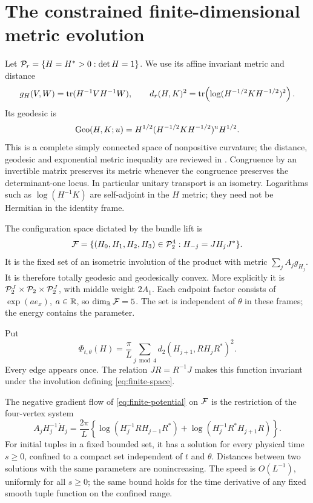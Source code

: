 \section{The constrained finite-dimensional metric evolution}\label{sec:finite-flow}

Let $\mathcal P_r=\{H=H^*>0:\det H=1\}$. We use its affine invariant metric
and distance
\begin{equation}\label{eq:matrix-metric}
 g_H(V,W)=\operatorname{tr}(H^{-1}VH^{-1}W),\qquad
 d_r(H,K)^2=\operatorname{tr}\!\left(\log(H^{-1/2}KH^{-1/2})^2\right).
\end{equation}
Its geodesic is
\[
 \operatorname{Geo}(H,K;u)=H^{1/2}(H^{-1/2}KH^{-1/2})^uH^{1/2}.
\]
This is a complete simply connected space of nonpositive curvature;
the distance, geodesic and exponential metric inequality are reviewed
in \cite[Section 2.3]{bhatia}.
Congruence by an invertible matrix preserves its metric whenever the
congruence preserves the determinant-one locus. In particular unitary
transport is an isometry. Logarithms such as $\log(H^{-1}K)$ are
self-adjoint in the $H$ metric; they need not be Hermitian in the
identity frame.

The configuration space dictated by the bundle lift is
\begin{equation}\label{eq:finite-space}
 \mathcal F=\{(H_0,H_1,H_2,H_3)\in\mathcal P_2^4:
                   H_{-j}=JH_jJ^*\}.
\end{equation}
It is the fixed set of an isometric involution of the product with metric
$\sum_jA_jg_{H_j}$. It is therefore totally geodesic and geodesically
convex. More explicitly it is
$\mathcal P_2^J\times\mathcal P_2\times\mathcal P_2^J$, with middle weight $2A_1$.
Each endpoint factor consists of $\exp(ae_x)$, $a\in\mathbb R$, so
$\dim_\mathbb R\mathcal F=5$. The set is independent of $\theta$ in these frames;
the energy contains the parameter.

Put
\begin{equation}\label{eq:finite-potential}
 \Phi_{t,\theta}(H)=\frac\pi L\sum_{j\bmod4}
                d_2(H_{j+1},RH_jR^*)^2.
\end{equation}
Every edge appears once. The relation $JR=R^{-1}J$ makes this function
invariant under the involution defining \eqref{eq:finite-space}.

\begin{proposition}\label{prop:finite-flow}
The negative gradient flow of \eqref{eq:finite-potential} on $\mathcal F$ is
the restriction of the four-vertex system
\begin{equation}\label{eq:finite-flow}
 A_jH_j^{-1}\dot H_j=\frac{2\pi}{L}
 \left\{\log(H_j^{-1}RH_{j-1}R^*)
             +\log(H_j^{-1}R^*H_{j+1}R)\right\}.
\end{equation}
For initial tuples in a fixed bounded set, it has a solution for every
physical time $s\ge0$, confined to a compact set independent of $t$ and
$\theta$. Distances between two solutions with the same parameters are
nonincreasing. The speed is $O(L^{-1})$, uniformly for all $s\ge0$;
the same bound holds for the time derivative of any fixed smooth tuple
function on the confined range.
\end{proposition}

